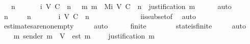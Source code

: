 \begin{isabellebody}
\ \ {\isachardoublequoteopen}{\isasymforall}\ n\ {\isasymin}\ {\isasymnat}{\isachardot}\ {\isacharparenleft}{\isasymforall}\ {\isasymsigma}{\isachardot}\ {\isasymsigma}\ {\isasymin}\ {\isasymSigma}{\isacharunderscore}i\ {\isacharparenleft}V{\isacharcomma}\ C{\isacharcomma}\ {\isasymepsilon}{\isacharparenright}\ n\ {\isasymlongrightarrow}\ {\isacharparenleft}{\isasymexists}\ m{\isachardot}\ m\ {\isasymin}\ M{\isacharunderscore}i\ {\isacharparenleft}V{\isacharcomma}\ C{\isacharcomma}\ {\isasymepsilon}{\isacharparenright}\ n\ {\isasymand}\ justification\ m\ {\isacharequal}\ {\isasymsigma}{\isacharparenright}{\isacharparenright}{\isachardoublequoteclose}\isanewline
%
\isadelimproof
\ \ %
\endisadelimproof
%
\isatagproof
{}\isamarkupfalse%
\ auto\isanewline
{}\isamarkupfalse%
\ {\isacharminus}\isanewline
\ \ \isamarkupfalse%
\ n\ {\isasymsigma}\isanewline
\ \ \isamarkupfalse%
\ {\isachardoublequoteopen}n\ {\isasymin}\ {\isasymnat}{\isachardoublequoteclose}\isanewline
\ \ \ {\isachardoublequoteopen}{\isasymsigma}\ {\isasymin}\ {\isasymSigma}{\isacharunderscore}i\ {\isacharparenleft}V{\isacharcomma}\ C{\isacharcomma}\ {\isasymepsilon}{\isacharparenright}\ n{\isachardoublequoteclose}\isanewline
\ \ \isamarkupfalse%
\ \isamarkupfalse%
\ {\isachardoublequoteopen}{\isasymsigma}\ {\isasymin}\ {\isasymSigma}{\isachardoublequoteclose}\isanewline
\ \ \ \ \isamarkupfalse%
\ {\isasymSigma}i{\isacharunderscore}is{\isacharunderscore}subset{\isacharunderscore}of{\isacharunderscore}{\isasymSigma}\ \isamarkupfalse%
\ auto\isanewline
\ \ \isamarkupfalse%
\ {\isachardoublequoteopen}{\isasymepsilon}\ {\isasymsigma}\ {\isasymnoteq}\ {\isasymemptyset}{\isachardoublequoteclose}\isanewline
\ \ \ \ \isamarkupfalse%
\ estimates{\isacharunderscore}are{\isacharunderscore}non{\isacharunderscore}empty\ {\isacartoucheopen}{\isasymsigma}\ {\isasymin}\ {\isasymSigma}{\isacartoucheclose}\ \isamarkupfalse%
\ auto\ \ \isanewline
\ \ \isamarkupfalse%
\ {\isachardoublequoteopen}finite\ {\isasymsigma}{\isachardoublequoteclose}\ \isanewline
\ \ \ \ \isamarkupfalse%
\ state{\isacharunderscore}is{\isacharunderscore}finite\ {\isacartoucheopen}{\isasymsigma}\ {\isasymin}\ {\isasymSigma}{\isacartoucheclose}\ \isamarkupfalse%
\ auto\isanewline
\ \ \isamarkupfalse%
\ \isamarkupfalse%
\ {\isachardoublequoteopen}{\isasymexists}\ m{\isachardot}\ sender\ m\ {\isasymin}\ V\ {\isasymand}\ est\ m\ {\isasymin}\ {\isasymepsilon}\ {\isasymsigma}\ {\isasymand}\ justification\ m\ {\isacharequal}\ {\isasymsigma}{\isachardoublequoteclose}\isanewline

\end{isabellebody}
